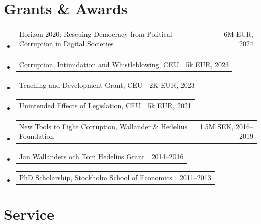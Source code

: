 \documentclass[10pt, a4paper]{article}
\makeatletter
\newcommand{\sans}{\fontfamily{phv}\selectfont}
\newcommand{\cvyear}[1]{%
  {\sans\fontsize{7.5}{9}\selectfont\color{inkfaint}#1}%
}
\newcommand{\cventry}[2]{%
  \noindent
  \begin{tabularx}{\textwidth}{@{}X@{\hspace{1em}}r@{}}
    #1 & \cvyear{#2}
  \end{tabularx}\vspace{1pt}%
}
\makeatother
\begin{document}
\section{Grants \& Awards}

\begin{itemize}
\item \cventry{Horizon 2020: Rescuing Democracy from Political Corruption in Digital Societies}{6M EUR, 2024}
\item \cventry{Corruption, Intimidation and Whistleblowing, CEU}{5k EUR, 2023}
\item \cventry{Teaching and Development Grant, CEU}{2K EUR, 2023}
\item \cventry{Unintended Effects of Legislation, CEU}{ 5k EUR, 2021}
\item \cventry{New Tools to Fight Corruption, Wallander \& Hedelius Foundation}{1.5M SEK, 2016–2019}
\item \cventry{Jan Wallanders och Tom Hedelius Grant}{2014–2016}
\item \cventry{PhD Scholarship, Stockholm School of Economics}{2011–2013}
\end{itemize}

\section{Service}
\end{document}
